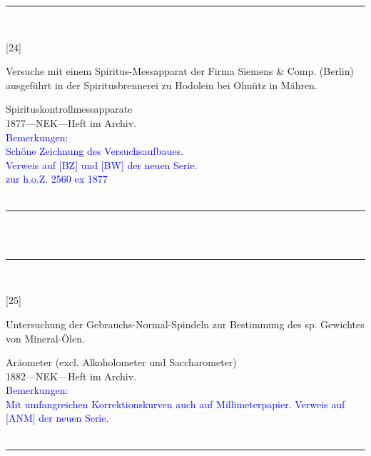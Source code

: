\parbox{\textwidth}{%
\rule{\textwidth}{1pt}\vspace*{-3mm}\\
\begin{minipage}[t]{0.15\textwidth}\vspace{0pt}
\Huge\rule[-4mm]{0cm}{1cm}[24]
\end{minipage}
\hfill
\begin{minipage}[t]{0.85\textwidth}\vspace{0pt}
\large Versuche mit einem Spiritus-Messapparat der Firma Siemens \&{} Comp. (Berlin) ausgeführt in der Spiritusbrennerei zu Hodolein bei Olmütz in Mähren.\rule[-2mm]{0mm}{2mm}
\end{minipage}
{\footnotesize\flushright
Spirituskontrollmessapparate\\
}
1877\quad---\quad NEK\quad---\quad Heft im Archiv.\\
\textcolor{blue}{Bemerkungen:\\{}
Schöne Zeichnung des Versuchsaufbaues.\\{}
Verweis auf [BZ] und [BW] der neuen Serie.\\{}
zur h.o.Z. 2560 ex 1877\\{}
}
\\[-15pt]
\rule{\textwidth}{1pt}
}
\\
\vspace*{-2.5pt}\\
\parbox{\textwidth}{%
\rule{\textwidth}{1pt}\vspace*{-3mm}\\
\begin{minipage}[t]{0.15\textwidth}\vspace{0pt}
\Huge\rule[-4mm]{0cm}{1cm}[25]
\end{minipage}
\hfill
\begin{minipage}[t]{0.85\textwidth}\vspace{0pt}
\large Untersuchung der Gebrauchs-Normal-Spindeln zur Bestimmung des sp. Gewichtes von Mineral-Ölen.\rule[-2mm]{0mm}{2mm}
\end{minipage}
{\footnotesize\flushright
Aräometer (excl. Alkoholometer und Saccharometer)\\
}
1882\quad---\quad NEK\quad---\quad Heft im Archiv.\\
\textcolor{blue}{Bemerkungen:\\{}
Mit umfangreichen Korrektionskurven auch auf Millimeterpapier. Verweis auf [ANM] der neuen Serie.\\{}
}
\\[-15pt]
\rule{\textwidth}{1pt}
}
